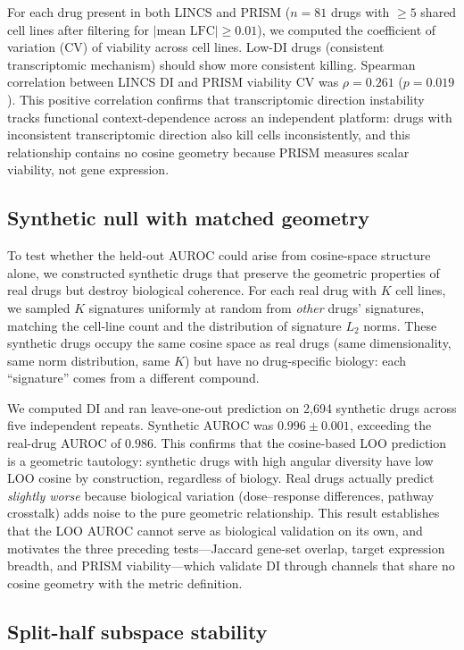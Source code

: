 \documentclass[11pt]{article}
\begin{document}
For each drug present in both LINCS and PRISM
($n = 81$ drugs with $\geq 5$ shared
cell lines after filtering for $|\text{mean LFC}| \geq 0.01$), we
computed the coefficient of variation (CV) of viability across cell
lines.  Low-DI drugs (consistent transcriptomic mechanism) should
show more consistent killing.  Spearman correlation between LINCS DI
and PRISM viability CV was
$\rho = 0.261$
($p = 0.019$).  This positive correlation
confirms that transcriptomic direction instability tracks functional
context-dependence across an independent platform: drugs with
inconsistent transcriptomic direction also kill cells inconsistently,
and this relationship contains no cosine geometry because PRISM
measures scalar viability, not gene expression.

\subsection{Synthetic null with matched geometry}

To test whether the held-out AUROC could arise from cosine-space
structure alone, we constructed synthetic drugs that preserve the
geometric properties of real drugs but destroy biological coherence.
For each real drug with $K$ cell lines, we sampled $K$ signatures
uniformly at random from \emph{other} drugs' signatures, matching the
cell-line count and the distribution of signature $L_2$ norms.  These
synthetic drugs occupy the same cosine space as real drugs (same
dimensionality, same norm distribution, same $K$) but have no
drug-specific biology: each ``signature'' comes from a different
compound.

We computed DI and ran leave-one-out prediction on
2{,}694 synthetic drugs across five independent repeats.  Synthetic AUROC was
$0.996 \pm 0.001$, exceeding the real-drug AUROC of $0.986$.  This
confirms that the cosine-based LOO prediction is a geometric tautology:
synthetic drugs with high angular diversity have low LOO cosine by
construction, regardless of biology.  Real drugs actually predict
\emph{slightly worse} because biological variation (dose--response
differences, pathway crosstalk) adds noise to the pure geometric
relationship.  This result establishes that the LOO AUROC cannot serve
as biological validation on its own, and motivates the three preceding
tests---Jaccard gene-set overlap, target expression breadth, and PRISM
viability---which validate DI through channels that share no cosine
geometry with the metric definition.

\subsection{Split-half subspace stability}
\end{document}

